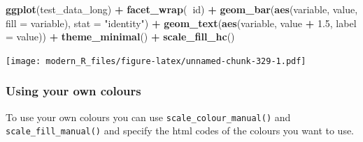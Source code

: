 \documentclass[]{gitbook}
\newenvironment{Shaded}{\begin{snugshade}}{\end{snugshade}}
\newcommand{\DataTypeTok}[1]{\textcolor[rgb]{0.13,0.29,0.53}{#1}}
\newcommand{\FloatTok}[1]{\textcolor[rgb]{0.00,0.00,0.81}{#1}}
\newcommand{\KeywordTok}[1]{\textcolor[rgb]{0.13,0.29,0.53}{\textbf{#1}}}
\newcommand{\NormalTok}[1]{#1}
\newcommand{\OperatorTok}[1]{\textcolor[rgb]{0.81,0.36,0.00}{\textbf{#1}}}
\newcommand{\StringTok}[1]{\textcolor[rgb]{0.31,0.60,0.02}{#1}}
\theoremstyle{definition}
\theoremstyle{definition}
\theoremstyle{definition}
\theoremstyle{remark}
\begin{document}
\begin{Shaded}
\begin{Highlighting}[]
\KeywordTok{ggplot}\NormalTok{(test_data_long) }\OperatorTok{+}
\StringTok{  }\KeywordTok{facet_wrap}\NormalTok{(}\OperatorTok{~}\NormalTok{id) }\OperatorTok{+}
\StringTok{  }\KeywordTok{geom_bar}\NormalTok{(}\KeywordTok{aes}\NormalTok{(variable, value, }\DataTypeTok{fill =}\NormalTok{ variable), }\DataTypeTok{stat =} \StringTok{"identity"}\NormalTok{) }\OperatorTok{+}
\StringTok{  }\KeywordTok{geom_text}\NormalTok{(}\KeywordTok{aes}\NormalTok{(variable, value }\OperatorTok{+}\StringTok{ }\FloatTok{1.5}\NormalTok{, }\DataTypeTok{label =}\NormalTok{ value)) }\OperatorTok{+}
\StringTok{  }\KeywordTok{theme_minimal}\NormalTok{() }\OperatorTok{+}
\StringTok{  }\KeywordTok{scale_fill_hc}\NormalTok{()}
\end{Highlighting}
\end{Shaded}

\texttt{[image: modern\_R\_files/figure-latex/unnamed-chunk-329-1.pdf]}

\hypertarget{using-your-own-colours}{%
\subsubsection{Using your own colours}\label{using-your-own-colours}}

To use your own colours you can use \texttt{scale\_colour\_manual()} and
\texttt{scale\_fill\_manual()} and specify the html codes of the colours
you want to use.

\begin{Shaded}
\end{Shaded}
\end{document}

